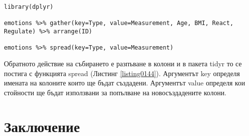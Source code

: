 \begin{lstlisting}[caption=Разпъване от редове в колони, label=listing0144]
library(dplyr)

emotions %>% gather(key=Type, value=Measurement, Age, BMI, React, Regulate) %>% arrange(ID)

emotions %>% spread(key=Type, value=Measurement)
\end{lstlisting}

Обратното действие на събирането е разпъване в колони и в пакета tidyr то се постига с функцията spread (Листинг \ref{listing0144}). Аргументът key определя имената на колоните които ще бъдат създадени. Аргументът value определя кои стойности ще бъдат използвани за попълване на новосъздадените колони. 

\section*{Заключение}


